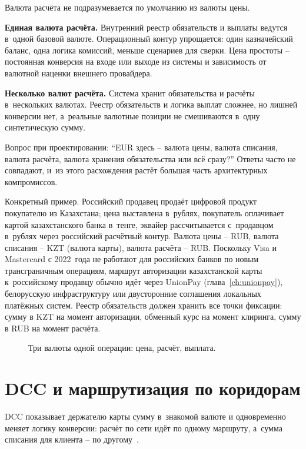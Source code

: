 Валюта расчёта не подразумевается по умолчанию из валюты цены.

\textbf{Единая валюта расчёта.} Внутренний реестр обязательств
и выплаты ведутся в~одной базовой валюте. Операционный контур
упрощается: один казначейский баланс, одна логика комиссий,
меньше сценариев для сверки. Цена простоты -- постоянная
конверсия на входе или выходе из системы и зависимость
от валютной наценки внешнего провайдера.

\textbf{Несколько валют расчёта.} Система хранит обязательства
и расчёты в~нескольких валютах. Реестр обязательств и логика
выплат сложнее, но лишней конверсии нет, а~реальные валютные
позиции не смешиваются в~одну синтетическую сумму.

Вопрос при проектировании: \enquote{EUR здесь --
  валюта цены, валюта списания,
валюта расчёта, валюта хранения обязательства или всё сразу?}
Ответы часто не совпадают, и~из этого расхождения растёт
большая часть архитектурных компромиссов.

Конкретный пример. Российский продавец продаёт цифровой продукт
покупателю из Казахстана; цена выставлена в~рублях, покупатель
оплачивает картой казахстанского банка в~тенге, эквайер
рассчитывается с~продавцом в~рублях через российский расчётный
контур. Валюта цены -- RUB, валюта списания -- KZT (валюта
карты), валюта расчёта -- RUB. Поскольку Visa и Mastercard
с 2022~года не работают для российских банков по новым
трансграничным операциям, маршрут авторизации казахстанской карты
к~российскому продавцу обычно идёт через UnionPay
(глава~\ref{ch:unionpay}), белорусскую инфраструктуру или
двусторонние соглашения локальных платёжных систем. Реестр
обязательств должен хранить все точки фиксации: сумму
в KZT на момент авторизации, обменный курс на момент
клиринга, сумму в RUB на момент расчёта.

\begin{figure}[tbp]
  \centering
  \caption{Три валюты одной операции: цена, расчёт, выплата.}\label{fig:three-currencies-timeline}
\end{figure}

\section{DCC и маршрутизация по коридорам}\label{sec:mc-dcc}

DCC показывает держателю карты сумму в~знакомой валюте
и одновременно меняет логику конверсии: расчёт по сети идёт
по одному маршруту, а~сумма списания для клиента --
по другому~\cite{visa-core-rules,mc-tpr}.

